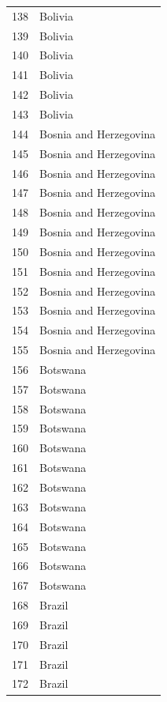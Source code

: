 \documentclass[
  letterpaper,
  DIV=11,
  numbers=noendperiod]{scrreprt}
\begin{document}
\begin{tabular}{ll}
138  &                   Bolivia \\
139  &                   Bolivia \\
140  &                   Bolivia \\
141  &                   Bolivia \\
142  &                   Bolivia \\
143  &                   Bolivia \\
144  &    Bosnia and Herzegovina \\
145  &    Bosnia and Herzegovina \\
146  &    Bosnia and Herzegovina \\
147  &    Bosnia and Herzegovina \\
148  &    Bosnia and Herzegovina \\
149  &    Bosnia and Herzegovina \\
150  &    Bosnia and Herzegovina \\
151  &    Bosnia and Herzegovina \\
152  &    Bosnia and Herzegovina \\
153  &    Bosnia and Herzegovina \\
154  &    Bosnia and Herzegovina \\
155  &    Bosnia and Herzegovina \\
156  &                  Botswana \\
157  &                  Botswana \\
158  &                  Botswana \\
159  &                  Botswana \\
160  &                  Botswana \\
161  &                  Botswana \\
162  &                  Botswana \\
163  &                  Botswana \\
164  &                  Botswana \\
165  &                  Botswana \\
166  &                  Botswana \\
167  &                  Botswana \\
168  &                    Brazil \\
169  &                    Brazil \\
170  &                    Brazil \\
171  &                    Brazil \\
172  &                    Brazil \\

\end{tabular}
\end{document}
